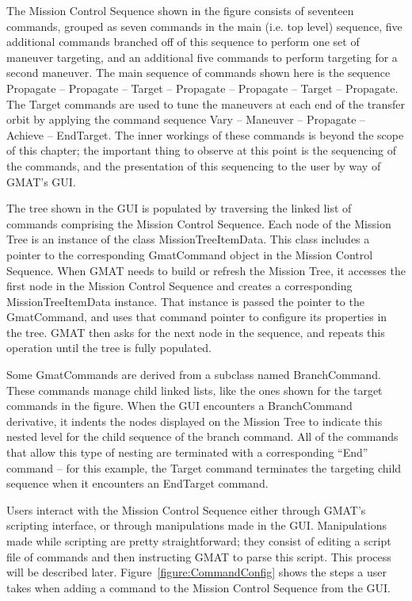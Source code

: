 The Mission Control Sequence shown in the figure consists of seventeen commands, grouped as seven
commands in the main (i.e. top level) sequence, five additional commands branched off of this
sequence to perform one set of maneuver targeting, and an additional five commands to perform
targeting for a second maneuver.  The main sequence of commands shown here is the sequence Propagate
-- Propagate -- Target -- Propagate -- Propagate -- Target -- Propagate.  The Target commands are
used to tune the maneuvers at each end of the transfer orbit by applying the command sequence Vary
-- Maneuver -- Propagate -- Achieve -- EndTarget.  The inner workings of these commands is beyond
the scope of this chapter; the important thing to observe at this point is the sequencing of the
commands, and the presentation of this sequencing to the user by way of GMAT's GUI.

The tree shown in the GUI is populated by traversing the linked list of commands comprising the
Mission Control Sequence.  Each node of the Mission Tree is an instance of the class
MissionTreeItemData.  This class includes a pointer to the corresponding GmatCommand object in the
Mission Control Sequence.  When GMAT needs to build or refresh the Mission Tree, it accesses the
first node in the Mission Control Sequence and creates a corresponding MissionTreeItemData instance.
That instance is passed the pointer to the GmatCommand, and uses that command pointer to configure
its properties in the tree.  GMAT then asks for the next node in the sequence, and repeats this
operation until the tree is fully populated.

Some GmatCommands are derived from a subclass named BranchCommand.  These commands manage child
linked lists, like the ones shown for the target commands in the figure.  When the GUI encounters a
BranchCommand derivative, it indents the nodes displayed on the Mission Tree to indicate this nested
level for the child sequence of the branch command.  All of the commands that allow this type of
nesting are terminated with a corresponding ``End'' command -- for this example, the Target command
terminates the targeting child sequence when it encounters an EndTarget command.

Users interact with the Mission Control Sequence either through GMAT's scripting interface, or
through manipulations made in the GUI.  Manipulations made while scripting are pretty
straightforward; they consist of editing a script file of commands and then instructing GMAT to
parse this script.  This process will be described later.  Figure~\ref{figure:CommandConfig} shows
the steps a user takes when adding a command to the Mission Control Sequence from the GUI.

